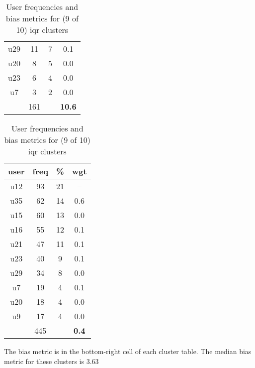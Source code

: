 \begin{appendices}
\begin{table}
\begin{tabular}{ |c|c|c|c| }
	u29 & 11 & 7 & 0.1 \\
	u20 & 8 & 5 & 0.0 \\
	u23 & 6 & 4 & 0.0 \\
	u7 & 3 & 2 & 0.0 \\
	 & 161 & & \textbf{10.6} \\
	\hline
\end{tabular}
\begin{tabular}{ |c|c|c|c| }
	\hline
	\textbf{user} & \textbf{freq} & \textbf{\%} & \textbf{wgt} \\
	\hline
	u12 & 93 & 21 & -- \\
	u35 & 62 & 14 & 0.6 \\
	u15 & 60 & 13 & 0.0 \\
	u16 & 55 & 12 & 0.1 \\
	u21 & 47 & 11 & 0.1 \\
	u23 & 40 & 9 & 0.1 \\
	u29 & 34 & 8 & 0.0 \\
	u7 & 19 & 4 & 0.1 \\
	u20 & 18 & 4 & 0.0 \\
	u9 & 17 & 4 & 0.0 \\
	 & 445 & & \textbf{0.4} \\
	\hline
\end{tabular}
\caption{User frequencies and bias metrics for (9 of 10) iqr clusters}
{\small The bias metric is in the bottom-right cell of each cluster table. The median bias metric for these clusters is 3.63}
\end{table}


\end{appendices}
